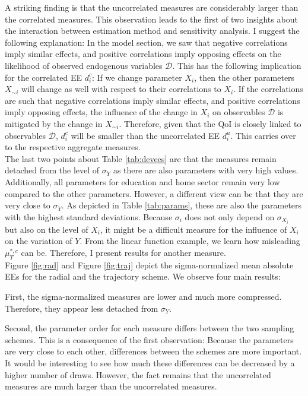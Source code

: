 \noindent
A striking finding is that the uncorrelated measures are considerably larger than the correlated measures. This observation leads to the first of two insights about the interaction between estimation method and sensitivity analysis. I suggest the following explanation: In the model section, we saw that negative correlations imply similar effects, and positive correlations imply opposing effects on the likelihood of observed endogenous variables $\pmb{\mathcal{D}}$. This has the following implication for the correlated EE $d_i^{c}$: If we change parameter $X_i$, then the other parameters $X_{\sim i}$ will change as well with respect to their correlations to $X_i$. If the correlations are such that negative correlations imply similar effects, and positive correlations imply opposing effects, the influence of the change in $X_i$ on observables $\pmb{\mathcal{D}}$ is mitigated by the change in $X_{\sim i}$. Therefore, given that the QoI is closely linked to observables $\pmb{\mathcal{D}}$, $d_i^{c}$ will be smaller than the uncorrelated EE $d_i^{u}$. This carries over to the respective aggregate measures.\\

\noindent
The last two points about Table \ref{tab:devees} are that the measures remain detached from the level of $\sigma_Y$ as there are also parameters with very high values. Additionally, all parameters for education and home sector remain very low compared to the other parameters. However, a different view can be that they are very close to $\sigma_Y$. As depicted in Table \ref{tab:params}, these are also the parameters with the highest standard deviations. Because $\sigma_i$ does not only depend on $\sigma_{X_i}$ but also on the level of $X_i$, it might be a difficult measure for the influence of $X_i$ on the variation of $Y$. From the linear function example, we learn how misleading $\mu^{*,c}_T$ can be. Therefore, I present results for another measure.\\


\noindent
Figure \ref{fig:rad} and Figure \ref{fig:traj} depict the sigma-normalized mean absolute EEs for the radial and the trajectory scheme. We observe four main results:


First, the sigma-normalized measures are lower and much more compressed. Therefore, they appear less detached from $\sigma_Y$.

Second, the parameter order for each measure differs between the two sampling schemes. This is a consequence of the first observation: Because the parameters are very close to each other, differences between the schemes are more important. It would be interesting to see how much these differences can be decreased by a higher number of draws. However, the fact remains that the uncorrelated measures are much larger than the uncorrelated measures.

